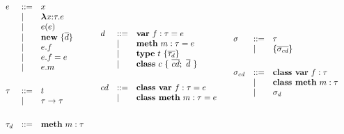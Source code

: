 \begin{figure*}
\[
\begin{array}{ccc}
\begin{array}{lll}
e    & ::= & x \\
     & \mathrel{\mid} & \boldsymbol\lambda x{:}\tau . e \\
     & \mathrel{\mid} & e(e) \\
     & \mathrel{\mid} & \textbf{new}~ \{ \overline{d} \} \\
     & \mathrel{\mid} & e.f \\
     & \mathrel{\mid} & e.f = e\\
     & \mathrel{\mid} & e.m \\
\\[1ex]

\tau & ::= & t \\
     & \mathrel{\mid} & \tau \rightarrow \tau \\
\\[1ex]

\tau_d  & ::= & \textbf{meth}~ m:\tau \\
\\[1ex]

\end{array}
&
\begin{array}{lll}
d    & ::= & \textbf{var}~ f:\tau = e \\
     & \mathrel{\mid} & \textbf{meth}~ m:\tau = e \\
     & \mathrel{\mid} & \textbf{type}~ t ~ \{ \overline{\tau_d} \} \\
     & \mathrel{\mid} & \textbf{class}~ c ~\{~ \overline{cd};~ \overline{d} ~\} \\
\\[1ex]

cd   & ::= & \textbf{class var}~ f:\tau = e \\
     & \mathrel{\mid} & \textbf{class meth}~ m:\tau = e \\
\\[1ex]
\end{array}
&
\begin{array}{lll}
\sigma   & ::= & \tau \\
     & \mathrel{\mid} & \{\overline{\sigma_{cd}}\} \\
\\[1ex]

\sigma_{cd}  & ::= & \textbf{class var}~ f : \tau \\
     & \mathrel{\mid} & \textbf{class meth}~ m : \tau \\
     & \mathrel{\mid} & \sigma_d \\
\\[1ex]


\end{array}
\end{array}\]
\end{figure*}
